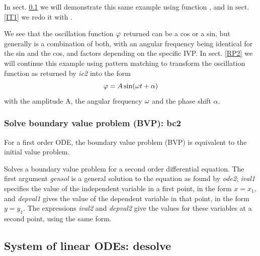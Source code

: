 \documentclass[../Maxima_Workbook.tex]{subfiles}
\begin{document}
\lz In sect. \ref{DE2} we will demonstrate this same example using function , and in sect. \ref{IT1} we redo it with . 

\lz We see that the oscillation function $ \varphi $ returned can be a cos or a sin, but generally is a combination of both, with an angular frequency being identical for the sin and the cos, and factors depending on the specific IVP. In sect. \ref{RP2} we will continue this example using pattern matching to transform the oscillation function as returned by \emph{ic2} into the form
\begin{equation*}
	\varphi = A \sin (\omega t + \alpha)
\end{equation*}
with the amplitude A, the angular frequency $ \omega $ and the phase shift $ \alpha $.

\subsubsection{Solve boundary value problem (BVP): bc2}

For a first order ODE, the boundary value problem (BVP) is equivalent to the initial value problem.

\lzz {} \hfill \tcr{[function]}

\lz Solves a boundary value problem for a second order differential equation. The first argument \emph{gensol} is a general solution to the equation as found by \emph{ode2}; \emph{ival1} specifies the value of the independent variable in a first point, in the form $ x = x_1 $, and \emph{depval1} gives the value of the dependent variable in that point, in the form $ y = y_1 $. The expressions \emph{ival2} and \emph{depval2} give the values for these variables at a second point, using the same form.

\subsection{System of linear ODEs: desolve}\label{DE2}

\lz {} \hfill \tcr{[function]}

\end{document}
